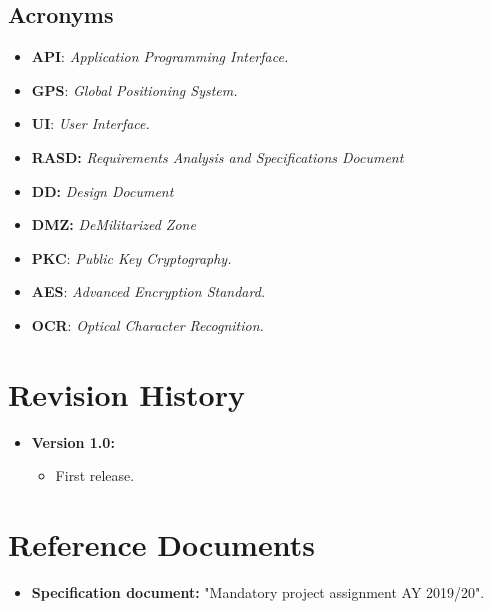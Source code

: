 \documentclass[12pt,a4paper]{report}
\begin{document}
			\subsection{Acronyms}
				\begin{itemize}
				\item \textbf{API}: \emph{Application Programming Interface.}
				\item \textbf{GPS}: \emph{Global Positioning System.}
				\item \textbf{UI}: \emph{User Interface.}
				\item \textbf{RASD:} \emph{Requirements Analysis and Specifications Document}
				\item \textbf{DD:} \emph{Design Document}
				\item \textbf{DMZ:} \emph{DeMilitarized Zone}
				\item \textbf{PKC}: \emph{Public Key Cryptography.}
				\item \textbf{AES}: \emph{Advanced Encryption Standard.}
				\item \textbf{OCR}: \emph{Optical Character Recognition.}
				\end{itemize}
		\section{Revision History}
			\begin{itemize}
				\item \textbf{Version 1.0:}
				\begin{itemize}
					\item First release.
				\end{itemize}
			\end {itemize}
		\section{Reference Documents}
			\begin{itemize}
				\item \textbf{Specification document:} "Mandatory project assignment AY 2019/20".
			\end{itemize}
\end{document}
